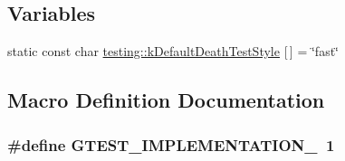 \subsection*{Variables}
\begin{DoxyCompactItemize}
\item 
static const char \hyperlink{namespacetesting_a317291240e750e2142a23cbd52bc5aec}{testing\+::k\+Default\+Death\+Test\+Style} \mbox{[}$\,$\mbox{]} = \char`\"{}fast\char`\"{}
\end{DoxyCompactItemize}


\subsection{Macro Definition Documentation}
\subsubsection[{\texorpdfstring{G\+T\+E\+S\+T\+\_\+\+I\+M\+P\+L\+E\+M\+E\+N\+T\+A\+T\+I\+O\+N\+\_\+}{GTEST_IMPLEMENTATION_}}]{\setlength{\rightskip}{0pt plus 5cm}\#define G\+T\+E\+S\+T\+\_\+\+I\+M\+P\+L\+E\+M\+E\+N\+T\+A\+T\+I\+O\+N\+\_\+~1}\hypertarget{gtest-death-test_8cc_a83bd232fd1077579fada92c31bb7469f}{}\label{gtest-death-test_8cc_a83bd232fd1077579fada92c31bb7469f}
